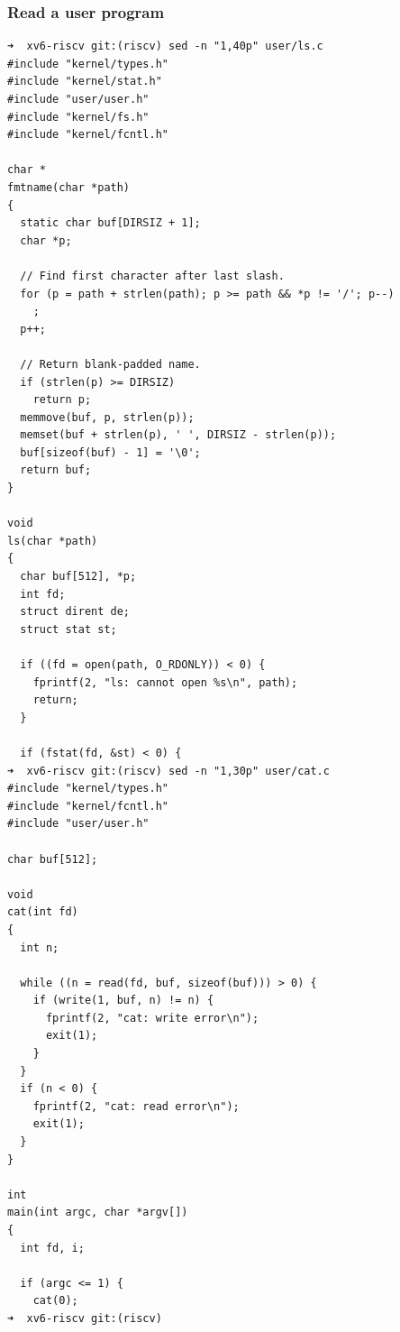 \documentclass{labreport}
\begin{document}
\subsubsection{Read a user program}
\begin{lstlisting}[style=bash]
➜  xv6-riscv git:(riscv) sed -n "1,40p" user/ls.c
#include "kernel/types.h"
#include "kernel/stat.h"
#include "user/user.h"
#include "kernel/fs.h"
#include "kernel/fcntl.h"

char *
fmtname(char *path)
{
  static char buf[DIRSIZ + 1];
  char *p;

  // Find first character after last slash.
  for (p = path + strlen(path); p >= path && *p != '/'; p--)
    ;
  p++;

  // Return blank-padded name.
  if (strlen(p) >= DIRSIZ)
    return p;
  memmove(buf, p, strlen(p));
  memset(buf + strlen(p), ' ', DIRSIZ - strlen(p));
  buf[sizeof(buf) - 1] = '\0';
  return buf;
}

void
ls(char *path)
{
  char buf[512], *p;
  int fd;
  struct dirent de;
  struct stat st;

  if ((fd = open(path, O_RDONLY)) < 0) {
    fprintf(2, "ls: cannot open %s\n", path);
    return;
  }

  if (fstat(fd, &st) < 0) {
➜  xv6-riscv git:(riscv) sed -n "1,30p" user/cat.c
#include "kernel/types.h"
#include "kernel/fcntl.h"
#include "user/user.h"

char buf[512];

void
cat(int fd)
{
  int n;

  while ((n = read(fd, buf, sizeof(buf))) > 0) {
    if (write(1, buf, n) != n) {
      fprintf(2, "cat: write error\n");
      exit(1);
    }
  }
  if (n < 0) {
    fprintf(2, "cat: read error\n");
    exit(1);
  }
}

int
main(int argc, char *argv[])
{
  int fd, i;

  if (argc <= 1) {
    cat(0);
➜  xv6-riscv git:(riscv)
\end{lstlisting}
\end{document}
